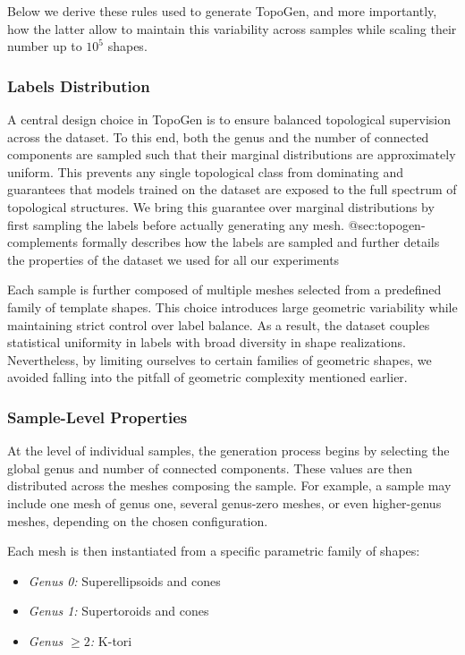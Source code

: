 Below we derive these rules used to generate TopoGen, and more importantly, how the latter allow to maintain this variability across samples while scaling their number up to $10^5$ shapes.

\subsubsection{Labels Distribution}
\label{sssec:labels-distribution}

A central design choice in TopoGen is to ensure balanced topological supervision across the dataset. To this end, both the genus and the number of connected components are sampled such that their marginal distributions are approximately uniform. This prevents any single topological class from dominating and guarantees that models trained on the dataset are exposed to the full spectrum of topological structures. We bring this guarantee over marginal distributions by first sampling the labels before actually generating any mesh. @sec:topogen-complements formally describes how the labels are sampled and further details the properties of the dataset we used for all our experiments

Each sample is further composed of multiple meshes selected from a predefined family of template shapes. This choice introduces large geometric variability while maintaining strict control over label balance. As a result, the dataset couples statistical uniformity in labels with broad diversity in shape realizations. Nevertheless, by limiting ourselves to certain families of geometric shapes, we avoided falling into the pitfall of geometric complexity mentioned earlier. 

\subsubsection{Sample-Level Properties}
\label{sssec:sample-level-properties}

At the level of individual samples, the generation process begins by selecting the global genus and number of connected components. These values are then distributed across the meshes composing the sample. For example, a sample may include one mesh of genus one, several genus-zero meshes, or even higher-genus meshes, depending on the chosen configuration.

Each mesh is then instantiated from a specific parametric family of shapes:
\begin{itemize}
  \item \textit{Genus 0:} Superellipsoids and cones
  \item \textit{Genus 1:} Supertoroids and cones
  \item \textit{Genus $\geq 2$:} K-tori
\end{itemize}

